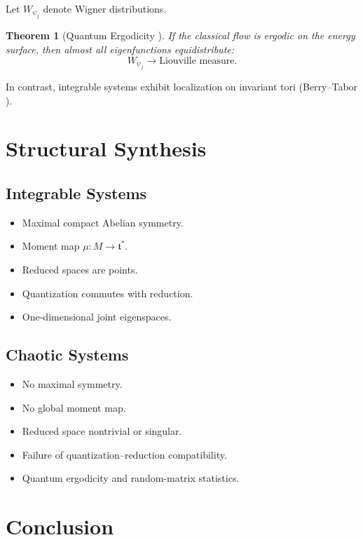 \documentclass[11pt]{article}
\newtheorem{theorem}{Theorem}[section]
\begin{document}
Let $W_{\psi_j}$ denote Wigner distributions.

\begin{theorem}[Quantum Ergodicity \cite{Shnirelman,Zelditch}]
If the classical flow is ergodic on the energy surface, then almost all eigenfunctions equidistribute:
\[
W_{\psi_j} \to \text{Liouville measure}.
\]
\end{theorem}

In contrast, integrable systems exhibit localization on invariant tori (Berry--Tabor \cite{BerryTabor}).

\section{Structural Synthesis}

\subsection*{Integrable Systems}

\begin{itemize}
\item Maximal compact Abelian symmetry.
\item Moment map $\mu: M \to \mathfrak{t}^*$.
\item Reduced spaces are points.
\item Quantization commutes with reduction.
\item One-dimensional joint eigenspaces.
\end{itemize}

\subsection*{Chaotic Systems}

\begin{itemize}
\item No maximal symmetry.
\item No global moment map.
\item Reduced space nontrivial or singular.
\item Failure of quantization--reduction compatibility.
\item Quantum ergodicity and random-matrix statistics.
\end{itemize}

\section{Conclusion}
\end{document}
